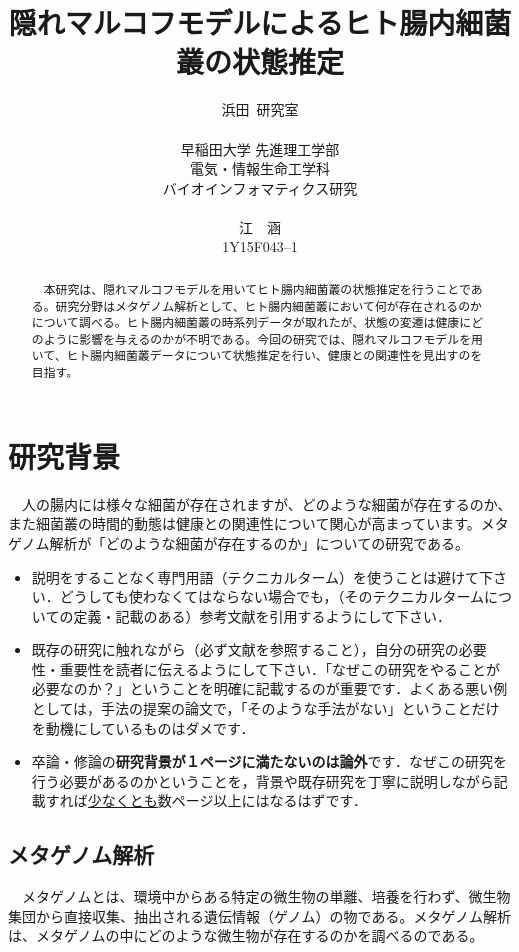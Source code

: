 \documentclass[dvipdfmx,autodetect-engine]{jsreport}
\title{隠れマルコフモデルによるヒト腸内細菌叢の状態推定}
\author{浜田~研究室\\
\\
早稲田大学 先進理工学部\\
電気・情報生命工学科\\ 
バイオインフォマティクス研究\\
\\
江　涵\\
1Y15F043–1
}
\begin{document}
\maketitle

\begin{abstract}
　本研究は、隠れマルコフモデルを用いてヒト腸内細菌叢の状態推定を行うことである。研究分野はメタゲノム解析として、ヒト腸内細菌叢において何が存在されるのかについて調べる。ヒト腸内細菌叢の時系列データが取れたが、状態の変遷は健康にどのように影響を与えるのかが不明である。今回の研究では、隠れマルコフモデルを用いて、ヒト腸内細菌叢データについて状態推定を行い、健康との関連性を見出すのを目指す。

\end{abstract}

\setcounter{tocdepth}{2} %
\tableofcontents

\chapter{研究背景}

　人の腸内には様々な細菌が存在されますが、どのような細菌が存在するのか、また細菌叢の時間的動態は健康との関連性について関心が高まっています。メタゲノム解析が「どのような細菌が存在するのか」についての研究である。
\begin{itemize}
\item 説明をすることなく専門用語（テクニカルターム）を使うことは避けて下さい．どうしても使わなくてはならない場合でも，（そのテクニカルタームについての定義・記載のある）参考文献を引用するようにして下さい．
\item  既存の研究に触れながら（必ず文献を参照すること），自分の研究の必要性・重要性を読者に伝えるようにして下さい．「なぜこの研究をやることが必要なのか？」ということを明確に記載するのが重要です．よくある悪い例としては，手法の提案の論文で，「そのような手法がない」ということだけを動機にしているものはダメです．
\item 卒論・修論の\textbf{研究背景が１ページに満たないのは論外}です．なぜこの研究を行う必要があるのかということを，背景や既存研究を丁寧に説明しながら記載すれば\underline{少なくとも}数ページ以上にはなるはずです．
\end{itemize}

\section{メタゲノム解析}

\begin{itemize}
　メタゲノムとは、環境中からある特定の微生物の単離、培養を行わず、微生物集団から直接収集、抽出される遺伝情報（ゲノム）の物である。メタゲノム解析は、メタゲノムの中にどのような微生物が存在するのかを調べるのである。

\end{itemize}
\end{document}
